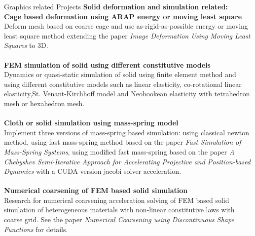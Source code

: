 \documentclass{resume} %
\begin{document}
\begin{rSection}{Graphics related Projects}
  \textbf{Solid deformation and simulation related:}\\
         {\bf Cage based deformation using ARAP energy or moving least square}\\Deform mesh based on coarse cage and use as-rigid-as-possible energy or moving least square method extending the paper \emph{Image Deformation Using Moving Least Squares} to 3D.\\
         \\{\bf FEM simulation of solid using different constitutive models}\\Dynamics or quasi-static simulation of solid using finite element method and using different constitutive models such as linear elasticity, co-rotational  linear elasticity,St. Venant-Kirchhoff model and Neohookean elasticity with tetrahedron mesh or hexahedron mesh. \\
         \\{\bf Cloth or solid simulation using mass-spring model}\\Implement three versions of mass-spring based simulation: using classical newton method, using fast mass-spring method based on the paper \emph{Fast Simulation of Mass-Spring Systems}, using modified fast mass-spring based on the paper \emph{A Chebyshev Semi-Iterative Approach for Accelerating Projective and Position-based Dynamics} with a CUDA version jacobi solver acceleration.\\
         \\{\bf Numerical coarsening of FEM based solid simulation}\\ Research for numerical coarsening acceleration solving of FEM based solid simulation of heterogeneous materials with non-linear constitutive laws with coarse grid. See the paper \emph{Numerical Coarsening using Discontinuous Shape Functions} for details.


\end{rSection}
\end{document}
